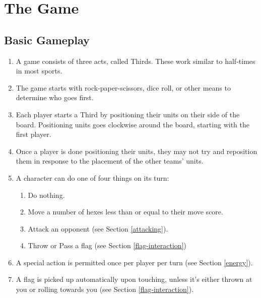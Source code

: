 \chapter{The Game}
\section{Basic Gameplay} \label{basic-gameplay}
\begin{enumerate}
    \item A game consists of three acts, called Thirds. These work similar to half-times in most sports.
    \item The game starts with rock-paper-scissors, dice roll, or other means to determine who goes first.
    \item Each player starts a Third by positioning their units on their side of the board. Positioning units goes clockwise around the board, starting with the first player. 
    \item Once a player is done positioning their units, they may not try and reposition them in response to the placement of the other teams’ units.
    \item A character can do one of four things on its turn:
    \begin{enumerate}
        \item Do nothing.
        \item Move a number of hexes less than or equal to their move score.
        \item Attack an opponent (see Section \ref{attacking}).
        \item Throw or Pass a flag (see Section \ref{flag-interaction})
    \end{enumerate}
    \item A special action is permitted once per player per turn (see Section \ref{energy}).
    \item A flag is picked up automatically upon touching, unless it’s either thrown at you or rolling towards you (see Section \ref{flag-interaction}).
\end{enumerate}







